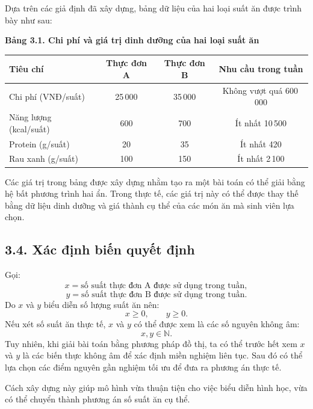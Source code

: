 \documentclass[12pt,a4paper]{article}
\begin{document}
Dựa trên các giả định đã xây dựng, bảng dữ liệu của hai loại suất ăn được trình bày như sau:

\begin{center}
\textbf{Bảng 3.1. Chi phí và giá trị dinh dưỡng của hai loại suất ăn}
\end{center}

\begin{center}
\renewcommand{\arraystretch}{1.4}

\begin{tabular}{|p{4.0cm}|c|c|c|}
\hline
\textbf{Tiêu chí}
&
\textbf{Thực đơn A}
&
\textbf{Thực đơn B}
&
\textbf{Nhu cầu trong tuần}
\\
\hline

Chi phí (VNĐ/suất)
&
25\,000
&
35\,000
&
Không vượt quá 600\,000
\\
\hline

Năng lượng (kcal/suất)
&
600
&
700
&
Ít nhất 10\,500
\\
\hline

Protein (g/suất)
&
20
&
35
&
Ít nhất 420
\\
\hline

Rau xanh (g/suất)
&
100
&
150
&
Ít nhất 2\,100
\\
\hline

\end{tabular}
\end{center}

Các giá trị trong bảng được xây dựng nhằm tạo ra một bài toán có thể giải bằng hệ bất phương trình hai ẩn. Trong thực tế, các giá trị này có thể được thay thế bằng dữ liệu dinh dưỡng và giá thành cụ thể của các món ăn mà sinh viên lựa chọn.

\subsection*{3.4. Xác định biến quyết định}

Gọi:
\[
x = \text{số suất thực đơn A được sử dụng trong tuần},
\]
\[
y = \text{số suất thực đơn B được sử dụng trong tuần}.
\]
Do $x$ và $y$ biểu diễn số lượng suất ăn nên:
\[
x\geq0,\qquad y\geq0.
\]
Nếu xét số suất ăn thực tế, $x$ và $y$ có thể được xem là các số nguyên không âm:
\[
x,y\in\mathbb{N}.
\]
Tuy nhiên, khi giải bài toán bằng phương pháp đồ thị, ta có thể trước hết xem $x$ và $y$ là các biến thực không âm để xác định miền nghiệm liên tục. Sau đó có thể lựa chọn các điểm nguyên gần nghiệm tối ưu để đưa ra phương án thực tế.

Cách xây dựng này giúp mô hình vừa thuận tiện cho việc biểu diễn hình học, vừa có thể chuyển thành phương án số suất ăn cụ thể.
\end{document}
